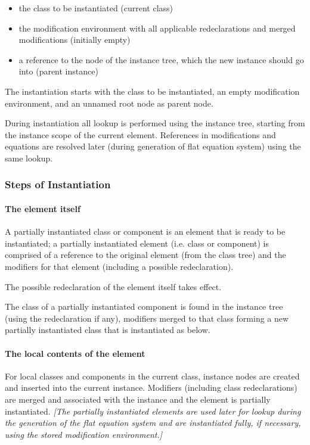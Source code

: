 \begin{itemize}
\item
  the class to be instantiated (current class)
\item
  the modification environment with all applicable redeclarations and
  merged modifications (initially empty)
\item
  a reference to the node of the instance tree, which the new instance
  should go into (parent instance)
\end{itemize}

The instantiation starts with the class to be instantiated, an empty
modification environment, and an unnamed root node as parent node.

During instantiation all lookup is performed using the instance tree,
starting from the instance scope of the current element. References in
modifications and equations are resolved later (during generation of
flat equation system) using the same lookup.

\subsubsection{Steps of Instantiation}

\paragraph{The element itself}

A partially instantiated class or component is an element that is ready
to be instantiated; a partially instantiated element (i.e. class or
component) is comprised of a reference to the original element (from the
class tree) and the modifiers for that element (including a possible
redeclaration).

The possible redeclaration of the element itself takes effect.

The class of a partially instantiated component is found in the instance
tree (using the redeclaration if any), modifiers merged to that class
forming a new partially instantiated class that is instantiated as
below.

\paragraph{The local contents of the element}

For local classes and components in the current class, instance nodes
are created and inserted into the current instance. Modifiers (including
class redeclarations) are merged and associated with the instance and
the element is partially instantiated. \emph{{[}The partially
instantiated elements are used later for lookup during the generation of
the flat equation system and are instantiated fully, if necessary, using
the stored modification environment.{]}}

